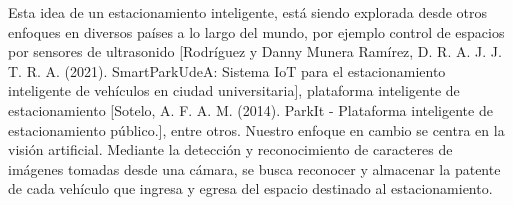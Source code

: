 Esta idea de un estacionamiento inteligente, está siendo explorada desde otros enfoques en diversos países a lo largo del mundo, por ejemplo control de espacios por sensores de ultrasonido [Rodríguez y Danny Munera Ramírez, D. R. A. J. J. T. R. A. (2021). SmartParkUdeA: Sistema IoT para el estacionamiento inteligente de vehículos en ciudad universitaria], plataforma inteligente de estacionamiento [Sotelo, A. F. A. M. (2014). ParkIt - Plataforma inteligente de estacionamiento público.], entre otros. Nuestro enfoque en cambio se centra en la visión artificial. Mediante la detección y reconocimiento de caracteres de imágenes tomadas desde una cámara, se busca reconocer y almacenar la patente de cada vehículo que ingresa y egresa del espacio destinado al estacionamiento.
